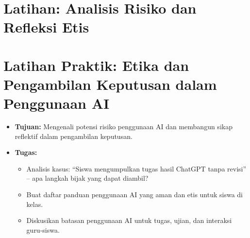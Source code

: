 \section{Latihan: Analisis Risiko dan Refleksi Etis}

\section*{Latihan Praktik: Etika dan Pengambilan Keputusan dalam Penggunaan AI}
\begin{itemize}
	\item \textbf{Tujuan:} Mengenali potensi risiko penggunaan AI dan membangun sikap reflektif dalam pengambilan keputusan.
	\item \textbf{Tugas:}
	\begin{itemize}
		\item Analisis kasus: “Siswa mengumpulkan tugas hasil ChatGPT tanpa revisi” – apa langkah bijak yang dapat diambil?
		\item Buat daftar panduan penggunaan AI yang aman dan etis untuk siswa di kelas.
		\item Diskusikan batasan penggunaan AI untuk tugas, ujian, dan interaksi guru-siswa.
	\end{itemize}
\end{itemize}
